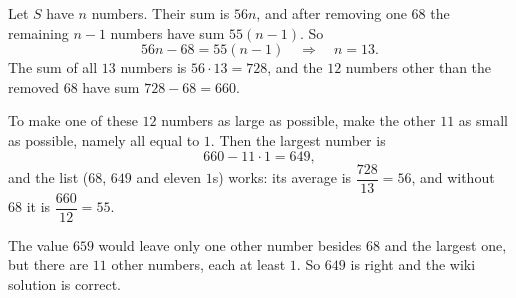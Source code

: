 Let $S$ have $n$ numbers. Their sum is $56n$, and after removing one $68$ the remaining $n-1$ numbers have sum $55(n-1)$. So
\[
56n-68=55(n-1)\quad\Longrightarrow\quad n=13 .
\]
The sum of all $13$ numbers is $56\cdot13=728$, and the $12$ numbers other than the removed $68$ have sum $728-68=660$.

To make one of these $12$ numbers as large as possible, make the other $11$ as small as possible, namely all equal to $1$. Then the largest number is
\[
660-11\cdot1=\boxed{649},
\]
and the list ($68$, $649$ and eleven $1$s) works: its average is $\dfrac{728}{13}=56$, and without $68$ it is $\dfrac{660}{12}=55$.

The value $659$ would leave only one other number besides $68$ and the largest one, but there are $11$ other numbers, each at least $1$. So $649$ is right and the wiki solution is correct.
